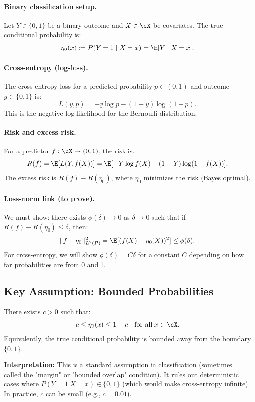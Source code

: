 \paragraph{Binary classification setup.}
Let $Y \in \{0,1\}$ be a binary outcome and $X \in \cX$ be covariates. The true conditional probability is:
\[
\eta_0(x) := P(Y = 1 \mid X = x) = \E[Y \mid X = x].
\]

\paragraph{Cross-entropy (log-loss).}
The cross-entropy loss for a predicted probability $p \in (0,1)$ and outcome $y \in \{0,1\}$ is:
\[
L(y, p) = -y \log p - (1-y) \log(1-p).
\]
This is the negative log-likelihood for the Bernoulli distribution.

\paragraph{Risk and excess risk.}
For a predictor $f: \cX \to (0,1)$, the risk is:
\[
R(f) = \E[L(Y, f(X))] = \E[-Y \log f(X) - (1-Y) \log(1-f(X))].
\]
The excess risk is $R(f) - R(\eta_0)$, where $\eta_0$ minimizes the risk (Bayes optimal).

\paragraph{Loss-norm link (to prove).}
We must show: there exists $\phi(\delta) \to 0$ as $\delta \to 0$ such that if $R(f) - R(\eta_0) \le \delta$, then:
\[
\|f - \eta_0\|_{L^2(P)}^2 = \E[(f(X) - \eta_0(X))^2] \le \phi(\delta).
\]
For cross-entropy, we will show $\phi(\delta) = C\delta$ for a constant $C$ depending on how far probabilities are from 0 and 1.

\subsection{Key Assumption: Bounded Probabilities}

\begin{assumption}
\label{assump:bounded-probs}
There exists $c > 0$ such that:
\[
c \le \eta_0(x) \le 1-c \quad \text{for all } x \in \cX.
\]
Equivalently, the true conditional probability is bounded away from the boundary $\{0, 1\}$.
\end{assumption}

\textbf{Interpretation:} This is a standard assumption in classification (sometimes called the "margin" or "bounded overlap" condition). It rules out deterministic cases where $P(Y=1|X=x) \in \{0,1\}$ (which would make cross-entropy infinite). In practice, $c$ can be small (e.g., $c = 0.01$).

